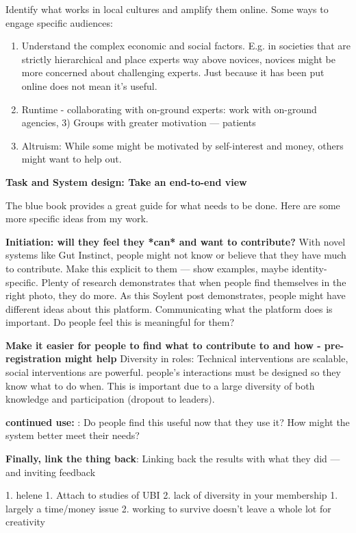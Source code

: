 Identify what works in local cultures and amplify them online. Some ways to engage specific audiences: 
\begin{enumerate}
\item Understand the complex economic and social factors. E.g. in societies that are strictly hierarchical and place experts way above novices, novices might be more concerned about challenging experts. Just because it has been put online does not mean it’s useful. 
\item Runtime - collaborating with on-ground experts: work with on-ground agencies, 3) Groups with greater motivation — patients
\item Altruism: While some might be motivated by self-interest and money, others might want to help out. 

\end{enumerate}

\textbf{Task and System design: Take an end-to-end view}

The blue book provides a great guide for what needs to be done. Here are some more specific ideas from my work.

\textbf{Initiation: will they feel they *can* and want to contribute?} With novel systems like Gut Instinct, people might not know or believe that they have much to contribute. Make this explicit to them — show examples, maybe identity-specific. Plenty of research demonstrates that when people find themselves in the right photo, they do more. As this Soylent post demonstrates, people might have different ideas about this platform. Communicating what the platform does is important. Do people feel this is meaningful for them?

\textbf{Make it easier for people to find what to contribute to and how - pre-registration might help} Diversity in roles: Technical interventions are scalable, social interventions are powerful. people’s interactions must be designed so they know what to do when. This is important due to a large diversity of both knowledge and participation  (dropout to leaders). 

\textbf{continued use: }:  Do people find this useful now that they use it? How might the system better meet their needs?


\textbf{Finally, link the thing back}: Linking back the results with what they did — and inviting feedback 


1. helene
    1. Attach to studies of UBI
    2. lack of diversity in your membership
        1. largely a time/money issue
        2. working to survive doesn’t leave a whole lot for creativity


